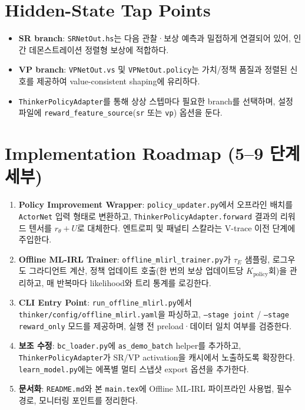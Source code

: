 \documentclass{article}
\begin{document}
\section{Hidden-State Tap Points}
\begin{itemize}
  \item \textbf{SR branch}: \texttt{SRNetOut.hs}는 다음 관찰·보상 예측과 밀접하게 연결되어 있어, 인간 데몬스트레이션 정렬형 보상에 적합하다.
  \item \textbf{VP branch}: \texttt{VPNetOut.vs} 및 \texttt{VPNetOut.policy}는 가치/정책 품질과 정렬된 신호를 제공하여 value-consistent shaping에 유리하다.
  \item \texttt{ThinkerPolicyAdapter}를 통해 상상 스텝마다 필요한 branch를 선택하며, 설정 파일에 \texttt{reward\_feature\_source}(\texttt{sr} 또는 \texttt{vp}) 옵션을 둔다.
\end{itemize}

\section{Implementation Roadmap (5–9 단계 세부)}
\begin{enumerate}
  \item \textbf{Policy Improvement Wrapper}: \texttt{policy\_updater.py}에서 오프라인 배치를 \texttt{ActorNet} 입력 형태로 변환하고, \texttt{ThinkerPolicyAdapter.forward} 결과의 리워드 텐서를 $r_{\theta}+U$로 대체한다. 엔트로피 및 패널티 스칼라는 V-trace 이전 단계에 주입한다.
  \item \textbf{Offline ML-IRL Trainer}: \texttt{offline\_mlirl\_trainer.py}가 $\tau_E$ 샘플링, 로그우도 그라디언트 계산, 정책 업데이트 호출(한 번의 보상 업데이트당 $K_{\text{policy}}$회)을 관리하고, 매 반복마다 likelihood와 트리 통계를 로깅한다.
  \item \textbf{CLI Entry Point}: \texttt{run\_offline\_mlirl.py}에서 \texttt{thinker/config/offline\_mlirl.yaml}을 파싱하고, \texttt{--stage joint} / \texttt{--stage reward\_only} 모드를 제공하며, 실행 전 preload·데이터 일치 여부를 검증한다.
  \item \textbf{보조 수정}: \texttt{bc\_loader.py}에 \texttt{as\_demo\_batch} helper를 추가하고, \texttt{ThinkerPolicyAdapter}가 SR/VP activation을 캐시에서 노출하도록 확장한다. \texttt{learn\_model.py}에는 에폭별 멀티 스냅샷 export 옵션을 추가한다.
  \item \textbf{문서화}: \texttt{README.md}와 본 \texttt{main.tex}에 Offline ML-IRL 파이프라인 사용법, 필수 경로, 모니터링 포인트를 정리한다.
\end{enumerate}
\end{document}
